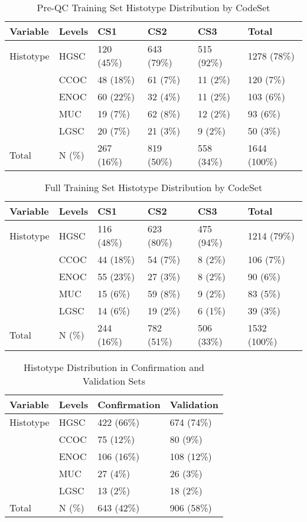 \documentclass[
]{report}
\begin{document}
\begin{table}

\caption{\label{tab:preqc-hist-codeset}Pre-QC Training Set Histotype Distribution by CodeSet}
\centering
\begin{tabular}[t]{l|l|l|l|l|l}
\hline
Variable & Levels & CS1 & CS2 & CS3 & Total\\
\hline
Histotype & HGSC & 120 (45\%) & 643 (79\%) & 515 (92\%) & 1278 (78\%)\\
\hline
 & CCOC & 48 (18\%) & 61 (7\%) & 11 (2\%) & 120 (7\%)\\
\hline
 & ENOC & 60 (22\%) & 32 (4\%) & 11 (2\%) & 103 (6\%)\\
\hline
 & MUC & 19 (7\%) & 62 (8\%) & 12 (2\%) & 93 (6\%)\\
\hline
 & LGSC & 20 (7\%) & 21 (3\%) & 9 (2\%) & 50 (3\%)\\
\hline
Total & N (\%) & 267 (16\%) & 819 (50\%) & 558 (34\%) & 1644 (100\%)\\
\hline
\end{tabular}
\end{table}

\begin{table}

\caption{\label{tab:train-hist-codeset}Full Training Set Histotype Distribution by CodeSet}
\centering
\begin{tabular}[t]{l|l|l|l|l|l}
\hline
Variable & Levels & CS1 & CS2 & CS3 & Total\\
\hline
Histotype & HGSC & 116 (48\%) & 623 (80\%) & 475 (94\%) & 1214 (79\%)\\
\hline
 & CCOC & 44 (18\%) & 54 (7\%) & 8 (2\%) & 106 (7\%)\\
\hline
 & ENOC & 55 (23\%) & 27 (3\%) & 8 (2\%) & 90 (6\%)\\
\hline
 & MUC & 15 (6\%) & 59 (8\%) & 9 (2\%) & 83 (5\%)\\
\hline
 & LGSC & 14 (6\%) & 19 (2\%) & 6 (1\%) & 39 (3\%)\\
\hline
Total & N (\%) & 244 (16\%) & 782 (51\%) & 506 (33\%) & 1532 (100\%)\\
\hline
\end{tabular}
\end{table}

\begin{table}

\caption{\label{tab:hist-conf-val}Histotype Distribution in Confirmation and Validation Sets}
\centering
\begin{tabular}[t]{l|l|l|l}
\hline
Variable & Levels & Confirmation & Validation\\
\hline
Histotype & HGSC & 422 (66\%) & 674 (74\%)\\
\hline
 & CCOC & 75 (12\%) & 80 (9\%)\\
\hline
 & ENOC & 106 (16\%) & 108 (12\%)\\
\hline
 & MUC & 27 (4\%) & 26 (3\%)\\
\hline
 & LGSC & 13 (2\%) & 18 (2\%)\\
\hline
Total & N (\%) & 643 (42\%) & 906 (58\%)\\
\hline
\end{tabular}
\end{table}
\end{document}
